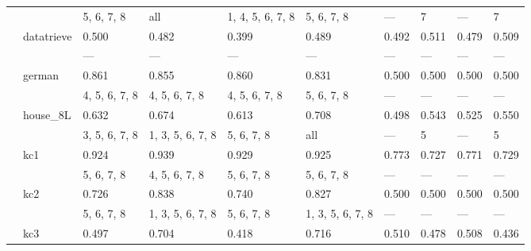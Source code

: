 \documentclass{article}
\begin{document}
\begin{center}
\begin{longtable}{p{1.2cm}p{1.8cm}p{1cm}p{1cm}p{1cm}p{1cm}p{1cm}p{1cm}p{1cm}p{1cm}}
             &              & 5, 6, 7, 8    & all              & 1, 4, 5, 6, 7, 8 & 5, 6, 7, 8       & ---              & 7                & ---              & 7                \\
             & datatrieve   & 0.500         & 0.482            & 0.399            & 0.489            & 0.492            & 0.511            & 0.479            & 0.509            \\
             &              & ---           & ---              & ---              & ---              & ---              & ---              & ---              & ---              \\
             & german       & 0.861         & 0.855            & 0.860            & 0.831            & 0.500            & 0.500            & 0.500            & 0.500            \\
             &              & 4, 5, 6, 7, 8 & 4, 5, 6, 7, 8    & 4, 5, 6, 7, 8    & 5, 6, 7, 8       & ---              & ---              & ---              & ---              \\
             & house\_8L     & 0.632         & 0.674            & 0.613            & 0.708            & 0.498            & 0.543            & 0.525            & 0.550            \\
             &              & 3, 5, 6, 7, 8 & 1, 3, 5, 6, 7, 8 & 5, 6, 7, 8       & all              & ---              & 5                & ---              & 5                \\
             & kc1          & 0.924         & 0.939            & 0.929            & 0.925            & 0.773            & 0.727            & 0.771            & 0.729            \\
             &              & 5, 6, 7, 8    & 4, 5, 6, 7, 8    & 5, 6, 7, 8       & 5, 6, 7, 8       & ---              & ---              & ---              & ---              \\
             & kc2          & 0.726         & 0.838            & 0.740            & 0.827            & 0.500            & 0.500            & 0.500            & 0.500            \\
             &              & 5, 6, 7, 8    & 1, 3, 5, 6, 7, 8 & 5, 6, 7, 8       & 1, 3, 5, 6, 7, 8 & ---              & ---              & ---              & ---              \\
             & kc3          & 0.497         & 0.704            & 0.418            & 0.716            & 0.510            & 0.478            & 0.508            & 0.436            \\

\end{longtable}
\end{center}
\end{document}
